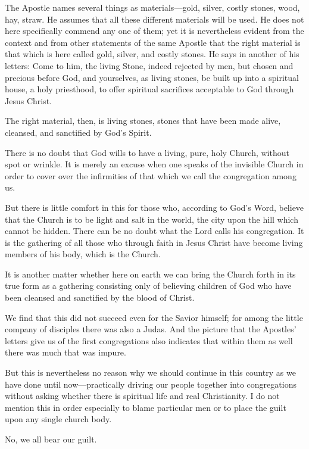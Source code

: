 The Apostle names several things as materials—gold, silver, costly stones, wood, hay, straw. He assumes that all these different materials will be used. He does not here specifically commend any one of them; yet it is nevertheless evident from the context and from other statements of the same Apostle that the right material is that which is here called gold, silver, and costly stones. He says in another of his letters: Come to him, the living Stone, indeed rejected by men, but chosen and precious before God, and yourselves, as living stones, be built up into a spiritual house, a holy priesthood, to offer spiritual sacrifices acceptable to God through Jesus Christ.

The right material, then, is living stones, stones that have been made alive, cleansed, and sanctified by God’s Spirit.

There is no doubt that God wills to have a living, pure, holy Church, without spot or wrinkle. It is merely an excuse when one speaks of the invisible Church in order to cover over the infirmities of that which we call the congregation among us.

But there is little comfort in this for those who, according to God’s Word, believe that the Church is to be light and salt in the world, the city upon the hill which cannot be hidden. There can be no doubt what the Lord calls his congregation. It is the gathering of all those who through faith in Jesus Christ have become living members of his body, which is the Church.

It is another matter whether here on earth we can bring the Church forth in its true form as a gathering consisting only of believing children of God who have been cleansed and sanctified by the blood of Christ.

We find that this did not succeed even for the Savior himself; for among the little company of disciples there was also a Judas. And the picture that the Apostles’ letters give us of the first congregations also indicates that within them as well there was much that was impure.

But this is nevertheless no reason why we should continue in this country as we have done until now—practically driving our people together into congregations without asking whether there is spiritual life and real Christianity. I do not mention this in order especially to blame particular men or to place the guilt upon any single church body.

No, we all bear our guilt.

